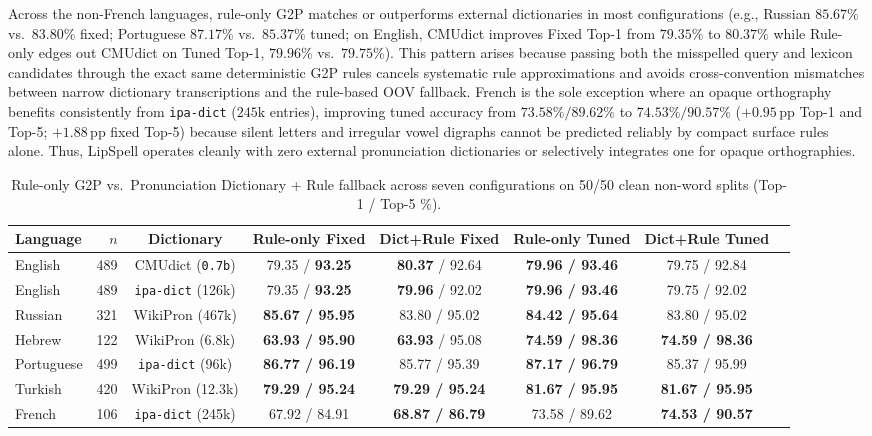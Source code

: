 \documentclass[11pt,a4paper]{article}
\begin{document}
Across the non-French languages, rule-only G2P matches or outperforms external dictionaries in most configurations (e.g., Russian $85.67\%$ vs.\ $83.80\%$ fixed; Portuguese $87.17\%$ vs.\ $85.37\%$ tuned; on English, CMUdict improves Fixed Top-1 from $79.35\%$ to $80.37\%$ while Rule-only edges out CMUdict on Tuned Top-1, $79.96\%$ vs.\ $79.75\%$). This pattern arises because passing both the misspelled query and lexicon candidates through the exact same deterministic G2P rules cancels systematic rule approximations and avoids cross-convention mismatches between narrow dictionary transcriptions and the rule-based OOV fallback. French is the sole exception where an opaque orthography benefits consistently from \texttt{ipa-dict} ($245\text{k}$ entries), improving tuned accuracy from $73.58\% / 89.62\%$ to $74.53\% / 90.57\%$ ($+0.95$\,pp Top-1 and Top-5; $+1.88$\,pp fixed Top-5) because silent letters and irregular vowel digraphs cannot be predicted reliably by compact surface rules alone. Thus, LipSpell operates cleanly with zero external pronunciation dictionaries or selectively integrates one for opaque orthographies.

\begin{table}[ht]
\centering
\scriptsize
\setlength{\tabcolsep}{2.8pt}
\caption{Rule-only G2P vs.\ Pronunciation Dictionary + Rule fallback across seven configurations on 50/50 clean non-word splits (Top-1 / Top-5 \%).}
\label{tab:g2p_ablation}
\begin{tabular}{lrcccccc}
\toprule
Language & $n$ & Dictionary & Rule-only Fixed & Dict+Rule Fixed & Rule-only Tuned & Dict+Rule Tuned \\
\midrule
English    & 489 & CMUdict (\texttt{0.7b})  & 79.35 / \textbf{93.25} & \textbf{80.37} / 92.64 & \textbf{79.96 / 93.46} & 79.75 / 92.84 \\
English    & 489 & \texttt{ipa-dict} (126k) & 79.35 / \textbf{93.25} & \textbf{79.96} / 92.02 & \textbf{79.96 / 93.46} & 79.75 / 92.02 \\
Russian    & 321 & WikiPron (467k)   & \textbf{85.67 / 95.95} & 83.80 / 95.02 & \textbf{84.42 / 95.64} & 83.80 / 95.02 \\
Hebrew     & 122 & WikiPron (6.8k)   & \textbf{63.93 / 95.90} & \textbf{63.93} / 95.08 & \textbf{74.59 / 98.36} & \textbf{74.59 / 98.36} \\
Portuguese & 499 & \texttt{ipa-dict} (96k)  & \textbf{86.77 / 96.19} & 85.77 / 95.39 & \textbf{87.17 / 96.79} & 85.37 / 95.99 \\
Turkish    & 420 & WikiPron (12.3k)  & \textbf{79.29 / 95.24} & \textbf{79.29 / 95.24} & \textbf{81.67 / 95.95} & \textbf{81.67 / 95.95} \\
French     & 106 & \texttt{ipa-dict} (245k) & 67.92 / 84.91 & \textbf{68.87 / 86.79} & 73.58 / 89.62 & \textbf{74.53 / 90.57} \\
\bottomrule
\end{tabular}
\end{table}
\end{document}
